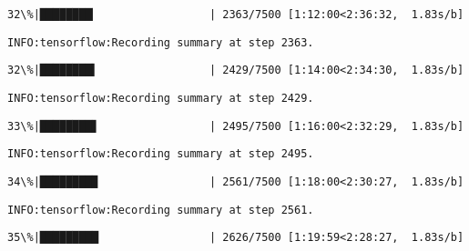 \documentclass[11pt]{article}
\begin{document}
    \begin{Verbatim}[commandchars=\\\{\}]
 32\%|████████▏                 | 2363/7500 [1:12:00<2:36:32,  1.83s/b]
    \end{Verbatim}

    \begin{Verbatim}[commandchars=\\\{\}]
INFO:tensorflow:Recording summary at step 2363.

    \end{Verbatim}

    \begin{Verbatim}[commandchars=\\\{\}]
 32\%|████████▍                 | 2429/7500 [1:14:00<2:34:30,  1.83s/b]
    \end{Verbatim}

    \begin{Verbatim}[commandchars=\\\{\}]
INFO:tensorflow:Recording summary at step 2429.

    \end{Verbatim}

    \begin{Verbatim}[commandchars=\\\{\}]
 33\%|████████▋                 | 2495/7500 [1:16:00<2:32:29,  1.83s/b]
    \end{Verbatim}

    \begin{Verbatim}[commandchars=\\\{\}]
INFO:tensorflow:Recording summary at step 2495.

    \end{Verbatim}

    \begin{Verbatim}[commandchars=\\\{\}]
 34\%|████████▉                 | 2561/7500 [1:18:00<2:30:27,  1.83s/b]
    \end{Verbatim}

    \begin{Verbatim}[commandchars=\\\{\}]
INFO:tensorflow:Recording summary at step 2561.

    \end{Verbatim}

    \begin{Verbatim}[commandchars=\\\{\}]
 35\%|█████████                 | 2626/7500 [1:19:59<2:28:27,  1.83s/b]
    \end{Verbatim}
\end{document}
